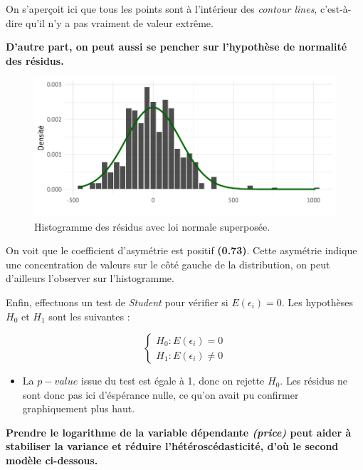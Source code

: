 \documentclass[
  12pt,
]{report}
\providecommand{\tightlist}{%
  \setlength{\itemsep}{0pt}\setlength{\parskip}{0pt}}\usepackage{longtable,booktabs,array}
\begin{document}
On s'aperçoit ici que tous les points sont à l'intérieur des
\emph{contour lines}, c'est-à-dire qu'il n'y a pas vraiment de valeur
extrême.

\textbf{D'autre part, on peut aussi se pencher sur l'hypothèse de
normalité des résidus.}

\begin{figure}[H]

{\centering \includegraphics{report_files/figure-pdf/normality_level-1.pdf}

}

\caption{Histogramme des résidus avec loi normale superposée.}

\end{figure}%

On voit que le coefficient d'asymétrie est positif \textbf{(0.73)}.
Cette asymétrie indique une concentration de valeurs sur le côté gauche
de la distribution, on peut d'ailleurs l'observer sur l'histogramme.

Enfin, effectuons un test de \emph{Student} pour vérifier si
\(E(\epsilon_i) = 0\). Les hypothèses \(H_0\) et \(H_1\) sont les
suivantes :

\[
\begin{cases}
H_0 : E(\epsilon_i) = 0\\
H_1 : E(\epsilon_i) \neq 0
\end{cases}
\]

\vspace{1em}

\begin{itemize}
\tightlist
\item
  La \(p-value\) issue du test est égale à 1, donc on rejette \(H_0\).
  Les résidus ne sont donc pas ici d'éspérance nulle, ce qu'on avait pu
  confirmer graphiquement plus haut.
\end{itemize}

\textbf{Prendre le logarithme de la variable dépendante \emph{(price)}
peut aider à stabiliser la variance et réduire l'hétéroscédasticité,
d'où le second modèle ci-dessous.}
\end{document}
